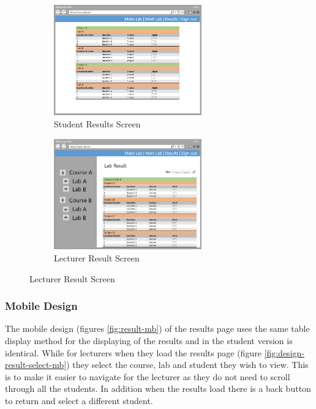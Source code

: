 \documentclass[12pt]{article}  %
\begin{document}
\begin{figure}[H]
\caption{Results Page: Desktop Designs}
\label{fig:result-pc}
\centering
\begin{subfigure}[c]{0.45\textwidth}
    \centering
    \includegraphics[width=0.70\textwidth]{images/design/result-student-desktop.png}
    \caption{Student Results Screen}
    \label{fig:design-result-student-pc}
\end{subfigure}
\hfill
\begin{subfigure}[c]{0.45\textwidth}
    \centering
    \includegraphics[width=0.7\textwidth]{images/design/result-lecturer-desktop.png}
    \caption{Lecturer Result Screen}
    \label{fig:design-result-lecturer-pc}
\end{subfigure}
\end{figure}

\subsubsection*{Mobile Design}

\noindent The mobile design (figures \ref{fig:result-mb}) of the results page uses the same table display method for the displaying of the results and in the student version is identical. While for lecturers when they load the results page (figure \ref{fig:design-result-select-mb}) they select the course, lab and student they wish to view. This is to make it easier to navigate for the lecturer as they do not need to scroll through all the students. In addition when the results load there is a back button to return and select a different student.
\end{document}
